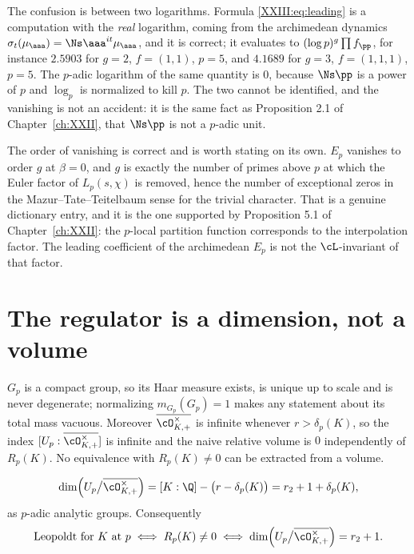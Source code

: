 \begin{remark}\label{XXIII:rem:realvsp}
The confusion is between two logarithms. Formula \eqref{XXIII:eq:leading} is a computation with the
\emph{real} logarithm, coming from the archimedean dynamics
$\sigma_t(\mu_\aaa)=\Ns\aaa^{it}\mu_\aaa$, and it is correct; it evaluates to
$(\log p)^g\prod f_\pp$, for instance $2.5903$ for $g=2$, $f=(1,1)$, $p=5$, and $4.1689$ for
$g=3$, $f=(1,1,1)$, $p=5$. The $p$-adic logarithm of the same quantity is $0$, because
$\Ns\pp$ is a power of $p$ and $\log_p$ is normalized to kill $p$. The two cannot be
identified, and the vanishing is not an accident: it is the same fact as
Proposition 2.1 of Chapter~\ref{ch:XXII}, that $\Ns\pp$ is not a $p$-adic unit.
\end{remark}

\begin{remark}\label{XXIII:rem:rightpart}
The order of vanishing is correct and is worth stating on its own. $E_p$ vanishes to order
$g$ at $\beta=0$, and $g$ is exactly the number of primes above $p$ at which the Euler factor
of $L_p(s,\chi)$ is removed, hence the number of exceptional zeros in the
Mazur--Tate--Teitelbaum sense \cite{MTT} for the trivial character. That is a genuine dictionary entry,
and it is the one supported by Proposition 5.1 of Chapter~\ref{ch:XXII}: the $p$-local partition function
corresponds to the interpolation factor. The leading coefficient of the archimedean $E_p$ is
not the $\cL$-invariant of that factor.
\end{remark}

\section{The regulator is a dimension, not a volume}

\begin{proposition}\label{XXIII:prop:novolume}
$G_p$ is a compact group, so its Haar measure exists, is unique up to scale and is never
degenerate; normalizing $m_{G_p}(G_p)=1$ makes any statement about its total mass vacuous.
Moreover $\overline{\cO^\times_{K,+}}$ is infinite whenever $r>\delta_p(K)$, so the index
$[U_p:\overline{\cO^\times_{K,+}}]$ is infinite and the naive relative volume is $0$
independently of $R_p(K)$. No equivalence with $R_p(K)\ne0$ can be extracted from a volume.
\end{proposition}

\begin{theorem}\label{XXIII:thm:dimension}
\[
\dim\Bigl(U_p\big/\overline{\cO^\times_{K,+}}\Bigr)
=[K:\Q]-\bigl(r-\delta_p(K)\bigr)
=r_2+1+\delta_p(K),
\]
as $p$-adic analytic groups. Consequently
\[
\text{Leopoldt for }K\text{ at }p\iff R_p(K)\ne0\iff \dim\Bigl(U_p\big/\overline{\cO^\times_{K,+}}\Bigr)=r_2+1 .
\]
\end{theorem}

